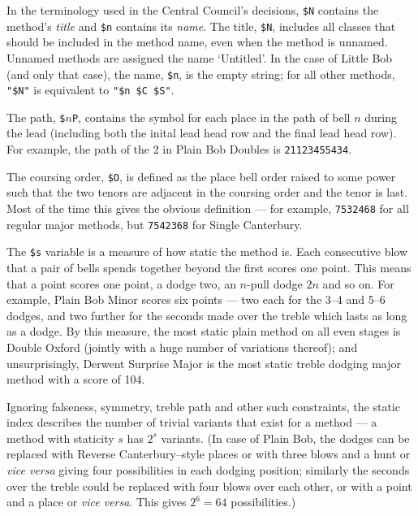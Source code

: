 \documentclass[a4paper,11pt,oneside]{book}
\makeatletter
\newcommand{\fspec}[1]{\index{#1@{\hspace*{-\fspecwidth}\texttt{\$#1}}}}
\makeatother
\begin{document}
In the terminology used in the Central Council's 
decisions, 
\verb+$N+ contains the method's \textit{title} 
and \verb+$n+ contains its \textit{name}.
The title, \verb+$N+\fspec{N}, includes all classes that should be 
included in the method name, even when the method is unnamed.  Unnamed methods
are assigned the name `Untitled'.  In the case of Little Bob (and only that 
case), the name, \verb+$n+, is the empty string; for all other methods,
\verb+"$N"+ is equivalent to \verb+"$n $C $S"+.

The path, \verb+$+$n$\verb+P+,\fspec{P} contains the symbol for
each place in the path of bell $n$ during the lead (including both the inital
lead head row and the final lead head row).  For example, the path of the 2
in Plain Bob Doubles is \verb+21123455434+.

The coursing order, \verb+$O+\fspec{O}, is defined as
the place bell order raised to some power such that 
the two tenors are adjacent in the coursing order and the tenor is last.
Most of the time this gives the obvious definition --- for example, 
\verb+7532468+ for all regular major methods, but \verb+7542368+ for 
Single Canterbury.

The \verb+$s+\fspec{s} variable is a measure of how static the method is.
Each consecutive blow that a pair of bells spends together beyond the first 
scores one point.  This means that a point scores one point, a dodge two, an $n$-pull dodge $2n$ and so on. For example, Plain Bob Minor scores six points 
--- two each for the 3--4 and 5--6 dodges, and two further for the seconds made
over the treble which lasts as long as a dodge.  By this measure, the most 
static plain method on all even stages is Double Oxford (jointly with 
a huge number of variations thereof); and unsurprisingly, Derwent Surprise
Major is the most static treble dodging major method with a score of 104.  

Ignoring falseness,
symmetry, treble path and other such constraints, the static index describes
the number of trivial variants that exist for a method --- a method with
staticity $s$ has $2^s$ variants.  (In case of Plain Bob, the dodges can be 
replaced with Reverse Canterbury--style places or with three blows and a hunt or \textit{vice versa} giving four possibilities in each dodging position; 
similarly the seconds over the treble could be replaced with four blows over
each other, or with a point and a place or \textit{vice versa}.  This gives
$2^6=64$ possibilities.)
\end{document}
